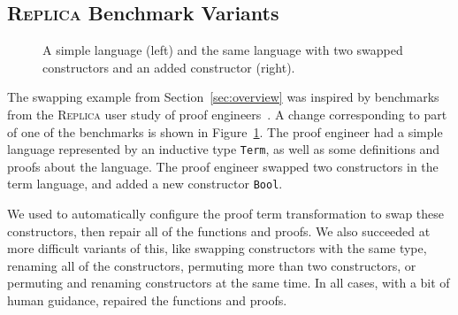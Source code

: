 
\iffalse
\subsection{\textsc{Replica} Benchmark Variants}
\label{sec:replica}

\begin{figure}
\begin{minipage}{0.49\columnwidth}
   
\end{minipage}
\hfill
\begin{minipage}{0.49\columnwidth}
   
\end{minipage}
\vspace{-0.4cm}
\caption{A simple language (left) and the same language with two swapped constructors and an added constructor (right).}
\vspace{-0.1cm}
\label{fig:replica}
\end{figure}

The swapping example from Section~\ref{sec:overview} was inspired by benchmarks 
from the \textsc{Replica} user study of proof engineers~\cite{replica}.
A change corresponding to part of one of the benchmarks is shown in Figure~\ref{fig:replica}.
The proof engineer had a simple language represented by an inductive type \lstinline{Term},
as well as some definitions and proofs about the language.
The proof engineer swapped two constructors in the term language,
and added a new constructor \lstinline{Bool}.

We used \toolname to automatically configure the proof term transformation to swap these constructors,
then repair all of the functions and proofs.
We also succeeded at more difficult variants of this,
like swapping constructors with the same type, renaming all of the constructors,
permuting more than two constructors,
or permuting and renaming constructors at the same time.
In all cases, with a bit of human guidance, \toolname repaired the functions and proofs.

